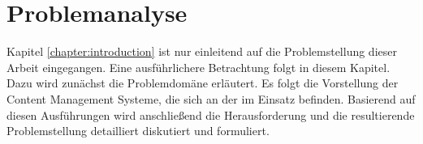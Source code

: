 \chapter{Problemanalyse}
    Kapitel \ref{chapter:introduction} ist nur einleitend
    auf die Problemstellung dieser Arbeit eingegangen.
    Eine ausführlichere Betrachtung folgt in diesem Kapitel.
    Dazu wird zunächst die Problemdomäne erläutert.
    Es folgt die Vorstellung der Content Management Systeme,
    die sich an der {\fernUni} im Einsatz befinden.
    Basierend auf diesen Ausführungen wird anschließend
    die Herausforderung und die resultierende Problemstellung
    detailliert diskutiert und formuliert.

    \label{chapter:ProblemAnalysis}
    
    
    




    
